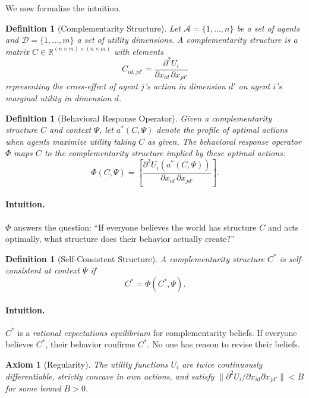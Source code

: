 \documentclass[12pt,a4paper]{article}
\newtheorem{definition}[theorem]{Definition}
\newtheorem{axiom}[theorem]{Axiom}
\begin{document}
We now formalize the intuition.

\begin{definition}[Complementarity Structure]
Let $\mathcal{A} = \{1, \ldots, n\}$ be a set of agents and 
$\mathcal{D} = \{1, \ldots, m\}$ a set of utility dimensions.
A \emph{complementarity structure} is a matrix 
$C \in \mathbb{R}^{(n \times m) \times (n \times m)}$ with elements
\[
  C_{id,jd'} = \frac{\partial^2 U_i}{\partial x_{id} \,\partial x_{jd'}}
\]
representing the cross-effect of agent $j$'s action in dimension $d'$ 
on agent $i$'s marginal utility in dimension $d$.
\end{definition}

\begin{definition}[Behavioral Response Operator]
Given a complementarity structure $C$ and context $\Psi$,
let $a^*(C, \Psi)$ denote the profile of optimal actions 
when agents maximize utility taking $C$ as given.
The \emph{behavioral response operator} $\Phi$ maps $C$ to the 
complementarity structure implied by these optimal actions:
\[
  \Phi(C, \Psi) = \left[ \frac{\partial^2 U_i(a^*(C,\Psi))}
                              {\partial x_{id} \,\partial x_{jd'}} \right].
\]
\end{definition}

\paragraph{Intuition.}
$\Phi$ answers the question: ``If everyone believes the world has structure $C$
and acts optimally, what structure does their behavior actually create?''

\begin{definition}[Self-Consistent Structure]
A complementarity structure $C^*$ is \emph{self-consistent} at context $\Psi$ if
\begin{equation}
  C^* = \Phi(C^*, \Psi).
  \label{eq:fixedpoint}
\end{equation}
\end{definition}

\paragraph{Intuition.}
$C^*$ is a \emph{rational expectations equilibrium} for complementarity beliefs.
If everyone believes $C^*$, their behavior confirms $C^*$.
No one has reason to revise their beliefs.

\begin{axiom}[Regularity]
\label{ax:regularity}
The utility functions $U_i$ are twice continuously differentiable,
strictly concave in own actions, and satisfy 
$\|\partial^2 U_i / \partial x_{id} \partial x_{jd'}\| < B$ 
for some bound $B > 0$.
\end{axiom}
\end{document}
